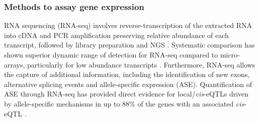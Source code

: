 



\subsubsection{Methods to assay gene expression}
RNA sequencing (RNA-seq) involves reverse-transcription of the extracted RNA into cDNA and PCR amplification preserving relative abundance of each transcript, followed by library preparation and NGS \parencite{Mortazavi2008}. Systematic comparison has shown superior dynamic range of detection for RNA-seq compared to micro-arrays, particularly for low abundance transcripts \parencite{Zhao2014}. Furthermore, RNA-seq allows the capture of additional information, including the identification of new exons, alternative splicing events and allele-specific expression (ASE). 
Quantification of ASE through RNA-seq has provided direct evidence for local/\textit{cis}-eQTLs driven by allele-specific mechanisms in up to 88\% of the genes with an associated \textit{cis}-eQTL \parencite{Yan2002,Pickrell2010}.%

